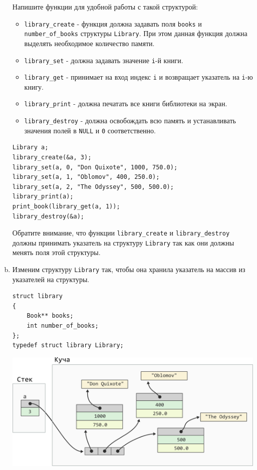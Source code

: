 \documentclass[10pt]{article}
\newcommand{\mallocImagesScale}{0.72}
\begin{document}
\begin{enumerate}[a.]
Напишите функции для удобной работы с такой структурой:
\begin{itemize}
\item \texttt{library\_create} - функция должна задавать поля \texttt{books} и \texttt{number\_of\_books} структуры \texttt{Library}. При этом данная функция должна выделять необходимое количество памяти.
\item \texttt{library\_set} - должна задавать значение \texttt{i}-й книги.
\item \texttt{library\_get} - принимает на вход индекс \texttt{i} и возвращает указатель на \texttt{i}-ю книгу.
\item \texttt{library\_print} - должна печатать все книги библиотеки на экран.
\item \texttt{library\_destroy} - должна освобождать всю память и устанавливать значения полей в \texttt{NULL} и \texttt{0} соответственно.
\end{itemize}
\begin{lstlisting}
Library a;
library_create(&a, 3);
library_set(a, 0, "Don Quixote", 1000, 750.0);
library_set(a, 1, "Oblomov", 400, 250.0);
library_set(a, 2, "The Odyssey", 500, 500.0);
library_print(a);
print_book(library_get(a, 1));
library_destroy(&a);
\end{lstlisting}

Обратите внимание, что функции \texttt{library\_create} и \texttt{library\_destroy} должны принимать указатель на структуру \texttt{Library} так как они должны менять поля этой структуры.


\iffalse
\item Изменим структуру \texttt{Library} так, чтобы она хранила указатель на массив из указателей на структуры.
\begin{lstlisting}
struct library 
{
    Book** books;
    int number_of_books;
};
typedef struct library Library;
\end{lstlisting}

\begin{center}
\includegraphics[scale=\mallocImagesScale]{../images/malloc_homework/11stack_struct_book_library.png}
\end{center}



\end{enumerate}
\end{document}
